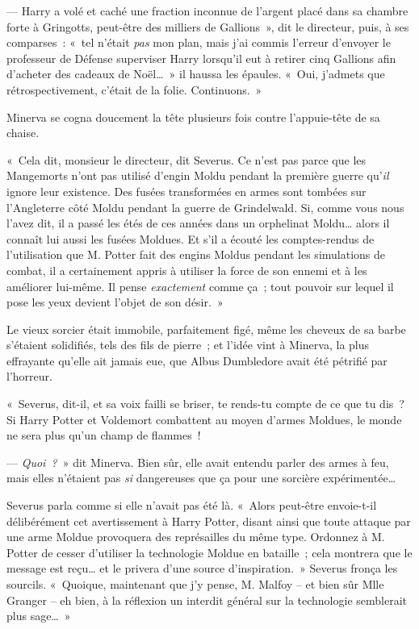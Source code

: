 --- Harry a volé et caché une fraction inconnue de l'argent placé dans sa chambre forte à Gringotts, peut-être des milliers de Gallions~», dit le directeur, puis, à ses comparses~: «~tel n'était \emph{pas} mon plan, mais j'ai commis l'erreur d'envoyer le professeur de Défense superviser Harry lorsqu'il eut à retirer cinq Gallions afin d'acheter des cadeaux de Noël…~»
il haussa les épaules.
«~Oui, j'admets que rétrospectivement, c'était de la folie.
Continuons.~»

Minerva se cogna doucement la tête plusieurs fois contre l'appuie-tête de sa chaise.

«~Cela dit, monsieur le directeur, dit Severus.
Ce n'est pas parce que les Mangemorts n'ont pas utilisé d'engin Moldu pendant la première guerre qu'\emph{il} ignore leur existence.
Des fusées transformées en armes sont tombées sur l'Angleterre côté Moldu pendant la guerre de Grindelwald.
Si, comme vous nous l'avez dit, il a passé les étés de ces années dans un orphelinat Moldu… alors il connaît lui aussi les fusées Moldues.
Et s'il a écouté les comptes-rendus de l'utilisation que M. Potter fait des engins Moldus pendant les simulations de combat, il a certainement appris à utiliser la force de son ennemi et à les améliorer lui-même.
Il pense \emph{exactement} comme ça~; tout pouvoir sur lequel il pose les yeux devient l'objet de son désir.~»

Le vieux sorcier était immobile, parfaitement figé, même les cheveux de sa barbe s'étaient solidifiés, tels des fils de pierre~; et l'idée vint à Minerva, la plus effrayante qu'elle ait jamais eue, que Albus Dumbledore avait été pétrifié par l'horreur.

«~Severus, dit-il, et sa voix failli se briser, te rends-tu compte de ce que tu dis~?
Si Harry Potter et Voldemort combattent au moyen d'armes Moldues, le monde ne sera plus qu'un champ de flammes~!

--- \emph{Quoi~?}~» dit Minerva.
Bien sûr, elle avait entendu parler des armes à feu, mais elles n'étaient pas \emph{si} dangereuses que ça pour une sorcière expérimentée…

Severus parla comme si elle n'avait pas été là.
«~Alors peut-être envoie-t-il délibérément cet avertissement à Harry Potter, disant ainsi que toute attaque par une arme Moldue provoquera des représailles du même type.
Ordonnez à M. Potter de cesser d'utiliser la technologie Moldue en bataille~; cela montrera que le message est reçu… et le privera d'une source d'inspiration.~»
Severus fronça les sourcils.
«~Quoique, maintenant que j'y pense, M. Malfoy -- et bien sûr Mlle Granger -- eh bien, à la réflexion un interdit général sur la technologie semblerait plus sage…~»

